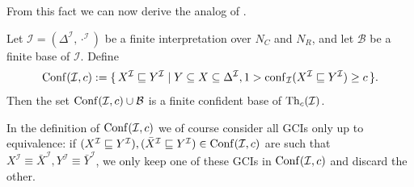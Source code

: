 From this fact we can now derive the analog of .

\begin{Theorem}
  \label{thm:conf-base}
  Let $\mathcal{I} = (\Delta^{\mathcal{I}}, \cdot^{\mathcal{I}})$ be a finite
  interpretation over $N_C$ and $N_R$, and let $\mathcal{B}$ be a finite base of
  $\mathcal{I}$.  Define
  \begin{equation*}
    \operatorname{Conf}(\mathcal{I}, c) := {\{\, X^{\mathcal{I}} \sqsubseteq Y^{\mathcal{I}} \mid Y
      \subseteq X \subseteq \Delta^{\mathcal{I}}, 1 > \operatorname{conf}_{\mathcal{I}}( X^{\mathcal{I}}
      \sqsubseteq Y^{\mathcal{I}} ) \ge c \,\}}.
  \end{equation*}
  Then the set $\operatorname{Conf}(\mathcal{I}, c) \cup \mathcal{B}$ is a finite confident base of
  $\operatorname{Th}_c(\mathcal{I})$.
\end{Theorem}

In the definition of $\operatorname{Conf}(\mathcal{I}, c)$ we of course consider all GCIs only up to
equivalence: if $(X^{\mathcal{I}} \sqsubseteq Y^{\mathcal{I}}), (\bar X^{\mathcal{I}}
\sqsubseteq Y^{\mathcal{I}}) \in \operatorname{Conf}(\mathcal{I}, c)$ are such that $X^{\mathcal{I}}
\equiv \bar X^{\mathcal{I}}, Y^{\mathcal{I}} \equiv \bar Y^{\mathcal{I}}$, we only keep
one of these GCIs in $\operatorname{Conf}(\mathcal{I}, c)$ and discard the other.


